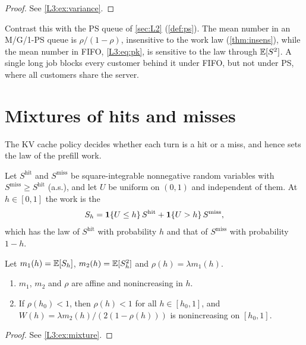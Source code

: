 \begin{proof}See \cref{L3:ex:variance}.\end{proof}

\begin{remark}
Contrast this with the PS queue of \cref{sec:L2} (\cref{def:ps}). The mean number
in an M/G/1-PS queue is $\rho/(1-\rho)$, insensitive to the work law
(\cref{thm:insens}), while the mean number in FIFO, \cref{L3:eq:pk}, is sensitive
to the law through $\mathbb{E}[S^2]$. A single long job blocks every customer behind it
under FIFO, but not under PS, where all customers share the server.
\end{remark}

\section{Mixtures of hits and misses}

The KV cache policy decides whether each turn is a hit or a miss, and hence sets
the law of the prefill work.

Let $S^{\mathrm{hit}}$ and $S^{\mathrm{miss}}$ be square-integrable nonnegative
random variables with $S^{\mathrm{miss}}\ge S^{\mathrm{hit}}$ (a.s.), and let $U$ be
uniform on $(0,1)$ and independent of them. At  $h\in[0,1]$ the work is
the 
\begin{equation}\label{L3:eq:mixture}
  S_h=\mathbf{1}\{U\le h\}\,S^{\mathrm{hit}}+\mathbf{1}\{U>h\}\,S^{\mathrm{miss}},
\end{equation}
which has the law of $S^{\mathrm{hit}}$ with probability $h$ and that of
$S^{\mathrm{miss}}$ with probability $1-h$.

\begin{corollary}\label{cor:mixture}
Let $m_1(h)=\mathbb{E}[S_h]$, $m_2(h)=\mathbb{E}[S_h^2]$ and $\rho(h)=\lambda m_1(h)$.
\begin{enumerate}[label=(\roman*)]
\item $m_1$, $m_2$ and $\rho$ are affine and nonincreasing in $h$.
\item If $\rho(h_0)<1$, then $\rho(h)<1$ for all $h\in[h_0,1]$, and
  $W(h)=\lambda m_2(h)/(2(1-\rho(h)))$ is nonincreasing on $[h_0,1]$.
\end{enumerate}
\end{corollary}

\begin{proof}See \cref{L3:ex:mixture}.\end{proof}

